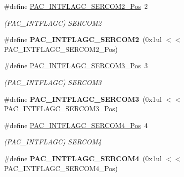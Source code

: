 \begin{DoxyCompactItemize}
\item 
\hypertarget{group___s_a_m_l21___p_a_c_gac07923bc4b4cd3c10e750ebb2cd675ef}{}\#define \hyperlink{group___s_a_m_l21___p_a_c_gac07923bc4b4cd3c10e750ebb2cd675ef}{P\+A\+C\+\_\+\+I\+N\+T\+F\+L\+A\+G\+C\+\_\+\+S\+E\+R\+C\+O\+M2\+\_\+\+Pos}~2\label{group___s_a_m_l21___p_a_c_gac07923bc4b4cd3c10e750ebb2cd675ef}

\begin{DoxyCompactList}\small\item\em (P\+A\+C\+\_\+\+I\+N\+T\+F\+L\+A\+G\+C) S\+E\+R\+C\+O\+M2 \end{DoxyCompactList}\item 
\hypertarget{group___s_a_m_l21___p_a_c_ga3178598bfa56aec539127e36f0653c17}{}\#define {\bfseries P\+A\+C\+\_\+\+I\+N\+T\+F\+L\+A\+G\+C\+\_\+\+S\+E\+R\+C\+O\+M2}~(0x1ul $<$$<$ P\+A\+C\+\_\+\+I\+N\+T\+F\+L\+A\+G\+C\+\_\+\+S\+E\+R\+C\+O\+M2\+\_\+\+Pos)\label{group___s_a_m_l21___p_a_c_ga3178598bfa56aec539127e36f0653c17}

\item 
\hypertarget{group___s_a_m_l21___p_a_c_gac950845249afd77f49f50d2d4edf1344}{}\#define \hyperlink{group___s_a_m_l21___p_a_c_gac950845249afd77f49f50d2d4edf1344}{P\+A\+C\+\_\+\+I\+N\+T\+F\+L\+A\+G\+C\+\_\+\+S\+E\+R\+C\+O\+M3\+\_\+\+Pos}~3\label{group___s_a_m_l21___p_a_c_gac950845249afd77f49f50d2d4edf1344}

\begin{DoxyCompactList}\small\item\em (P\+A\+C\+\_\+\+I\+N\+T\+F\+L\+A\+G\+C) S\+E\+R\+C\+O\+M3 \end{DoxyCompactList}\item 
\hypertarget{group___s_a_m_l21___p_a_c_gaf6f90f5feec01e2d7a338368084d4499}{}\#define {\bfseries P\+A\+C\+\_\+\+I\+N\+T\+F\+L\+A\+G\+C\+\_\+\+S\+E\+R\+C\+O\+M3}~(0x1ul $<$$<$ P\+A\+C\+\_\+\+I\+N\+T\+F\+L\+A\+G\+C\+\_\+\+S\+E\+R\+C\+O\+M3\+\_\+\+Pos)\label{group___s_a_m_l21___p_a_c_gaf6f90f5feec01e2d7a338368084d4499}

\item 
\hypertarget{group___s_a_m_l21___p_a_c_ga3b2e7b75953d564c5c1e38504b7d1168}{}\#define \hyperlink{group___s_a_m_l21___p_a_c_ga3b2e7b75953d564c5c1e38504b7d1168}{P\+A\+C\+\_\+\+I\+N\+T\+F\+L\+A\+G\+C\+\_\+\+S\+E\+R\+C\+O\+M4\+\_\+\+Pos}~4\label{group___s_a_m_l21___p_a_c_ga3b2e7b75953d564c5c1e38504b7d1168}

\begin{DoxyCompactList}\small\item\em (P\+A\+C\+\_\+\+I\+N\+T\+F\+L\+A\+G\+C) S\+E\+R\+C\+O\+M4 \end{DoxyCompactList}\item 
\hypertarget{group___s_a_m_l21___p_a_c_ga0dc4dae27dd07722b4035a4619c87423}{}\#define {\bfseries P\+A\+C\+\_\+\+I\+N\+T\+F\+L\+A\+G\+C\+\_\+\+S\+E\+R\+C\+O\+M4}~(0x1ul $<$$<$ P\+A\+C\+\_\+\+I\+N\+T\+F\+L\+A\+G\+C\+\_\+\+S\+E\+R\+C\+O\+M4\+\_\+\+Pos)\label{group___s_a_m_l21___p_a_c_ga0dc4dae27dd07722b4035a4619c87423}


\end{DoxyCompactItemize}
